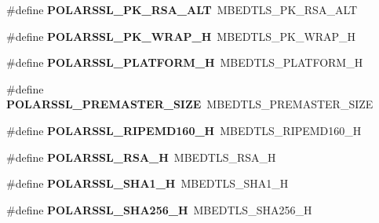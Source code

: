 \begin{DoxyCompactItemize}
\item 
\mbox{\label{compat-1_83_8h_a6a985026f42674ddceaed8972658eaba}} 
\#define {\bfseries P\+O\+L\+A\+R\+S\+S\+L\+\_\+\+P\+K\+\_\+\+R\+S\+A\+\_\+\+A\+LT}~M\+B\+E\+D\+T\+L\+S\+\_\+\+P\+K\+\_\+\+R\+S\+A\+\_\+\+A\+LT
\item 
\mbox{\label{compat-1_83_8h_a6d5718290ba13de3cb00c6093d4bac7d}} 
\#define {\bfseries P\+O\+L\+A\+R\+S\+S\+L\+\_\+\+P\+K\+\_\+\+W\+R\+A\+P\+\_\+H}~M\+B\+E\+D\+T\+L\+S\+\_\+\+P\+K\+\_\+\+W\+R\+A\+P\+\_\+H
\item 
\mbox{\label{compat-1_83_8h_a6b946c73a5b81ca5aad9a06741655121}} 
\#define {\bfseries P\+O\+L\+A\+R\+S\+S\+L\+\_\+\+P\+L\+A\+T\+F\+O\+R\+M\+\_\+H}~M\+B\+E\+D\+T\+L\+S\+\_\+\+P\+L\+A\+T\+F\+O\+R\+M\+\_\+H
\item 
\mbox{\label{compat-1_83_8h_a3d43b3813b0d42a149b718a526a824ea}} 
\#define {\bfseries P\+O\+L\+A\+R\+S\+S\+L\+\_\+\+P\+R\+E\+M\+A\+S\+T\+E\+R\+\_\+\+S\+I\+ZE}~M\+B\+E\+D\+T\+L\+S\+\_\+\+P\+R\+E\+M\+A\+S\+T\+E\+R\+\_\+\+S\+I\+ZE
\item 
\mbox{\label{compat-1_83_8h_a46921750ea87f288c82f87625922b29a}} 
\#define {\bfseries P\+O\+L\+A\+R\+S\+S\+L\+\_\+\+R\+I\+P\+E\+M\+D160\+\_\+H}~M\+B\+E\+D\+T\+L\+S\+\_\+\+R\+I\+P\+E\+M\+D160\+\_\+H
\item 
\mbox{\label{compat-1_83_8h_a78e2dfb2ede2ea44d104a85de29b0eb7}} 
\#define {\bfseries P\+O\+L\+A\+R\+S\+S\+L\+\_\+\+R\+S\+A\+\_\+H}~M\+B\+E\+D\+T\+L\+S\+\_\+\+R\+S\+A\+\_\+H
\item 
\mbox{\label{compat-1_83_8h_ab55bf46ad48172d68f557ede123c2c16}} 
\#define {\bfseries P\+O\+L\+A\+R\+S\+S\+L\+\_\+\+S\+H\+A1\+\_\+H}~M\+B\+E\+D\+T\+L\+S\+\_\+\+S\+H\+A1\+\_\+H
\item 
\mbox{\label{compat-1_83_8h_a202dd3f48da5d32f4ff577352cbd7774}} 
\#define {\bfseries P\+O\+L\+A\+R\+S\+S\+L\+\_\+\+S\+H\+A256\+\_\+H}~M\+B\+E\+D\+T\+L\+S\+\_\+\+S\+H\+A256\+\_\+H
\item 
\mbox{\label{compat-1_83_8h_acf35986f2a001db507be60183c87f9e1}} 

\end{DoxyCompactItemize}
